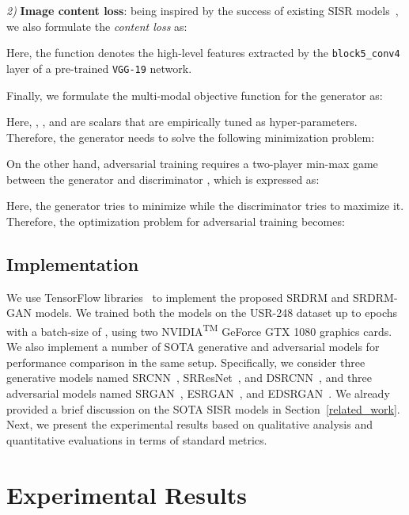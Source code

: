\documentclass[10pt,twocolumn,letterpaper]{article}
\begin{document}
    \textit{2)} \textbf{Image content loss}: being inspired by the success of existing SISR models~\cite{yang2019deep}, we also formulate the \textit{content loss} as:     
            
    Here, the function  denotes the high-level features extracted by the {\tt block5\_conv4} layer of a pre-trained {\tt VGG-19} network. 


Finally, we formulate the multi-modal objective function for the generator as: 

Here, , , and  are scalars that are empirically tuned as hyper-parameters. Therefore, the generator  needs to solve the following minimization problem:


On the other hand, adversarial training requires a two-player min-max game~\cite{goodfellow2014generative} between the generator  and discriminator , which is expressed as:   

Here, the generator tries to minimize  while the discriminator tries to maximize it. Therefore, the optimization problem for adversarial training becomes: 





\subsection{Implementation}
We use TensorFlow libraries~\cite{abadi2016tensorflow} to implement the proposed SRDRM and SRDRM-GAN models.
We trained both the models on the USR-248 dataset up to  epochs with a batch-size of , using two NVIDIA\textsuperscript{TM} GeForce GTX 1080 graphics cards.
We also implement a number of SOTA generative and adversarial models for performance comparison in the same setup. Specifically, we consider three generative models named SRCNN~\cite{dong2015image}, SRResNet~\cite{ledig2017photo,yang2019deep}, and DSRCNN~\cite{mao2016image}, and three adversarial models named SRGAN~\cite{ledig2017photo}, ESRGAN~\cite{wang2018esrgan}, and EDSRGAN~\cite{lim2017enhanced}. 
We already provided a brief discussion on the SOTA SISR models in  Section~\ref{related_work}.
Next, we present the experimental results based on qualitative analysis and quantitative evaluations in terms of standard metrics. 

\section{Experimental Results}
\end{document}
